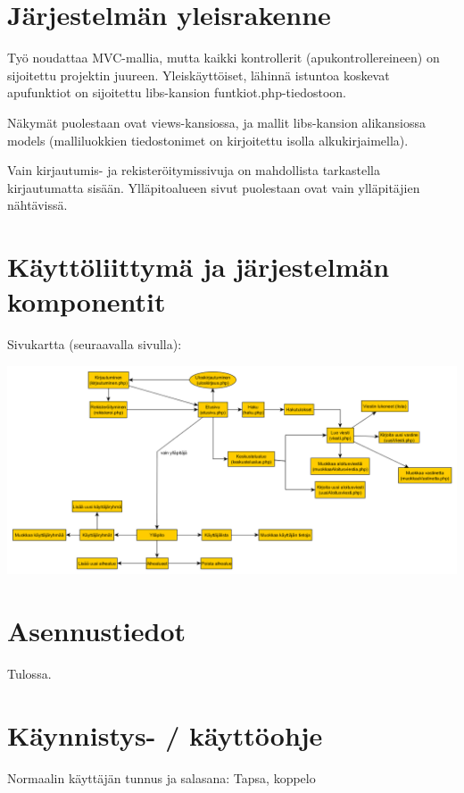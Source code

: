 \documentclass[12pt,a4paper,leqno]{report}
\begin{document}
\chapter{Järjestelmän yleisrakenne}

Työ noudattaa MVC-mallia, mutta kaikki kontrollerit (apukontrollereineen) on sijoitettu projektin juureen. Yleiskäyttöiset, lähinnä istuntoa koskevat apufunktiot on sijoitettu libs-kansion funtkiot.php-tiedostoon.

Näkymät puolestaan ovat views-kansiossa, ja mallit libs-kansion alikansiossa models (malliluokkien tiedostonimet on kirjoitettu isolla alkukirjaimella).

Vain kirjautumis- ja rekisteröitymissivuja on mahdollista tarkastella kirjautumatta sisään. Ylläpitoalueen sivut puolestaan ovat vain ylläpitäjien nähtävissä.

\chapter{Käyttöliittymä ja järjestelmän komponentit}

Sivukartta (seuraavalla sivulla):

\begin{sideways}
\includegraphics[scale=.55]{sivukartta}
\end{sideways}

\chapter{Asennustiedot}

Tulossa.

\chapter{Käynnistys- / käyttöohje}

Normaalin käyttäjän tunnus ja salasana: Tapsa, koppelo\\
\end{document}
